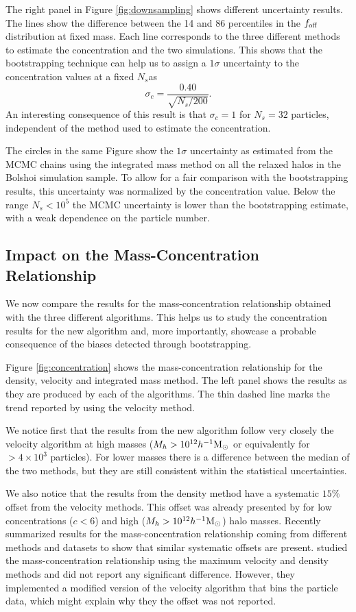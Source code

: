 \documentclass{emulateapj}
\newcommand{\hMsun}{{\ifmmode{h^{-1}{\rm {M_{\odot}}}}\else{$h^{-1}{\rm{M_{\odot}}}$}\fi}}
\begin{document}
The right panel in Figure \ref{fig:downsampling} shows different uncertainty
results.  
The lines show the difference between the 14 and 86 percentiles in the
$f_{\rm off}$ distribution at fixed mass. 
Each line corresponds to the three different methods to estimate the
concentration and the two simulations.
This shows that the bootstrapping technique can help us to assign a
$1\sigma$ uncertainty to the concentration values at a fixed $N_s$as 
%
\begin{equation}
\sigma_{c} = \frac{0.40}{\sqrt{N_s/200}}.
\end{equation}
%
An interesting consequence of this result is that $\sigma_c=1$ for
$N_s=32$ particles, independent of the method used to estimate the
concentration.  

The circles in the same Figure show the $1\sigma$ uncertainty as
estimated from the MCMC chains using the integrated mass method on all
the relaxed halos in the Bolshoi simulation sample. 
To allow for a fair comparison with the bootstrapping results, this
uncertainty was normalized by the concentration value.
Below the range $N_{s}<10^5$ the MCMC uncertainty is lower than the
bootstrapping estimate, with a weak dependence on the particle
number.
 
 
\subsection{Impact on the Mass-Concentration Relationship}

We now compare the results for the mass-concentration
relationship obtained with the three different algorithms.
This helps us to study the concentration results
for the new algorithm and, more importantly, showcase a probable
consequence of the biases detected through bootstrapping. 


Figure \ref{fig:concentration} shows the mass-concentration
relationship for the density, velocity and integrated mass method.
The left panel shows the results as they are produced by each of the
algorithms. The thin dashed line marks the trend reported by
\citep{Prada2012} using the velocity method.


We notice first that the results from the new algorithm follow very
closely the velocity algorithm at high masses ($M_h>10^{12}\hMsun$ or
equivalently for $>4\times10^3$ particles). 
For lower masses there is a difference between the median of the two
methods, but they are still consistent within the statistical
uncertainties.

We also notice that the results from the density method have a
systematic $15\%$ offset from the velocity methods.  
This offset was already presented by \cite{Prada2012} for low
concentrations ($c<6$) and high ($M_h>10^{12}\hMsun$) halo masses.  
Recently \citep{Klypin2016} summarized results for the
mass-concentration relationship coming from different methods and
datasets to show that similar systematic offsets are present.
\citep{2014MNRAS.441.3359D} studied the mass-concentration
relationship using the maximum velocity and density methods and did
not report any significant difference. 
However, they implemented a modified version of the velocity algorithm
that bins the particle data, which might explain why they the offset
was not reported.
\end{document}
